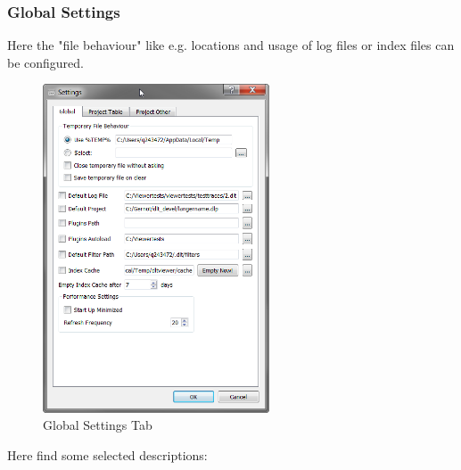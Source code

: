 \documentclass[a4paper,11pt]{article}
\begin{document}
\nopagebreak


\subsubsection{Global Settings}
\label{globalsettings}
Here the "file behaviour" like e.g. locations and usage of log files or index files can be configured.

\begin{figure}[H]
 \centering
 \includegraphics[width=0.6\textwidth]{images/settings_global.png}
 \caption{Global Settings Tab}
 \label{fig:globalsettingstab}
\end{figure}


Here find some selected descriptions:
\end{document}
